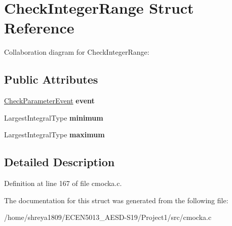 \hypertarget{structCheckIntegerRange}{}\section{Check\+Integer\+Range Struct Reference}
\label{structCheckIntegerRange}


Collaboration diagram for Check\+Integer\+Range\+:
\subsection*{Public Attributes}
\begin{DoxyCompactItemize}
\item 
\mbox{\label{structCheckIntegerRange_a143da2245bf12c28ebc8521e8925d98c}} 
\hyperlink{structCheckParameterEvent}{Check\+Parameter\+Event} {\bfseries event}
\item 
\mbox{\label{structCheckIntegerRange_afcc266d34a957220d9d2a202c67290ff}} 
Largest\+Integral\+Type {\bfseries minimum}
\item 
\mbox{\label{structCheckIntegerRange_a61124c5298a3b1542422125446ef3db1}} 
Largest\+Integral\+Type {\bfseries maximum}
\end{DoxyCompactItemize}


\subsection{Detailed Description}


Definition at line 167 of file cmocka.\+c.



The documentation for this struct was generated from the following file\+:\begin{DoxyCompactItemize}
\item 
/home/shreya1809/\+E\+C\+E\+N5013\+\_\+\+A\+E\+S\+D-\/\+S19/\+Project1/src/cmocka.\+c\end{DoxyCompactItemize}

